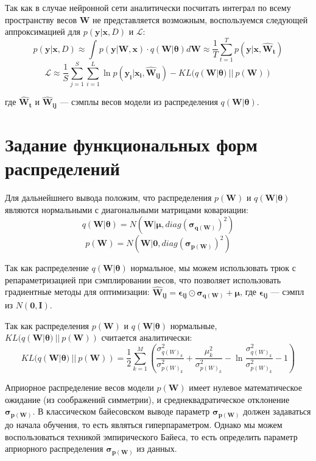 \documentclass{article}
\begin{document}
Так как в случае нейронной сети аналитически посчитать интеграл по всему пространству весов $\pmb{W}$ не представляется возможным, воспользуемся следующей аппроксимацией для $p(\pmb{y} | \pmb{x}, D)$ и $\mathcal{L}$:
\[
 p(\pmb{y} | \pmb{x}, D) \approx
 \int_{}{} p(\pmb{y} | \pmb{W}, \pmb{x}) \cdot q(\pmb{W} | \pmb{\theta}) d \pmb{W} \approx
 \dfrac{1}{T} \sum_{t=1}^{T}{p(\pmb{y} | \pmb{x}, \pmb{\hat{W}_{t}})}
\]
\[
 \mathcal{L} \approx
 \dfrac{1}{S} \sum_{j=1}^S \sum_{i=1}^{L} {\ln{p(\pmb{y_{i}} | \pmb{x_{i}}, \pmb{\hat{W}_{ij}})}} - KL(q(\pmb{W} | \pmb{\theta})~||~p(\pmb{W}))
\]

где $\pmb{\hat{W}_{t}}$ и $\pmb{\hat{W}_{ij}}$ --- сэмплы весов модели из распределения $q(\pmb{W} | \pmb{\theta})$.

\section{Задание функциональных форм распределений}

Для дальнейшнего вывода положим, что распределения $p(\pmb{W})$ и $q(\pmb{W} | \pmb{\theta})$ являются нормальными с диагональными матрицами ковариации:
\[
 q(\pmb{W} | \pmb{\theta}) = N(\pmb{W} | \pmb{\mu}, diag(\pmb{\sigma_{q(\pmb{W})}})^{2})
\]
\[
 p(\pmb{W}) = N(\pmb{W} | \pmb{0}, diag(\pmb{\sigma_{p(\pmb{W})}})^{2})
\]

Так как распределение $q(\pmb{W} | \pmb{\theta})$ нормальное, мы можем использовать трюк с репараметризацией при сэмплировании весов, что позволяет использовать градиентные методы для оптимизации:
$
\pmb{\hat{W}_{ij}} = \pmb{\epsilon_{ij}}  \odot \pmb{\sigma_{q(\pmb{W})}} + \pmb{\mu}
$, где $\pmb{\epsilon_{ij}}$ --- сэмпл из $N(\pmb{0}, \pmb{I})$.

Так как распределения $p(\pmb{W})$ и $q(\pmb{W} | \pmb{\theta})$ нормальные, $KL(q(\pmb{W} | \pmb{\theta})~||~p(\pmb{W}))$ считается аналитически:
\[
KL(q(\pmb{W} | \pmb{\theta})~||~p(\pmb{W})) =
\dfrac{1}{2}\sum_{k=1}^{M}(\dfrac{\sigma_{{q(W)_{k}}}^2}{\sigma_{{p(W)_{k}}}^2} + \dfrac{\mu_{k}^2}{\sigma_{{p(W)_{k}}}^2} - \ln{\dfrac{\sigma_{{q(W)_{k}}}^2}{\sigma_{{p(W)_{k}}}^2}} - 1)
\]

Априорное распределение весов модели $p(\pmb{W})$ имеет нулевое математическое ожидание (из соображений симметрии), и среднеквадратическое отклонение $\pmb{\sigma_{p(\pmb{W})}}$. В классическом байесовском выводе параметр $\pmb{\sigma_{p(\pmb{W})}}$ должен задаваться до начала обучения, то есть являться гиперпараметром. Однако мы можем воспользоваться техникой эмпирического Байеса, то есть определить параметр  априорного распределения $\pmb{\sigma_{p(\pmb{W})}}$ из данных.
\end{document}
